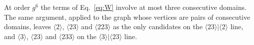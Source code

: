 At order $g^6$ the terms of Eq.~\eqref{eq:W} involve at most three consecutive domains. The same argument,
applied to the graph whose vertices are pairs of consecutive domains, leaves $\langle2\rangle$,
$\langle23\rangle$ and $\langle223\rangle$ as the only candidates on the $\langle23\rangle|\langle2\rangle$
line, and $\langle3\rangle$, $\langle23\rangle$ and $\langle233\rangle$ on the $\langle3\rangle|\langle23\rangle$
line.
